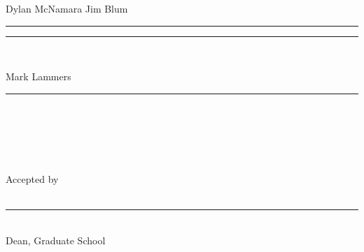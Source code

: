 \documentclass[12 pt]{uncw_thesis}
\begin{document}
\begin{singlespace}
\begin{center}
	Dylan McNamara \hspace{2.5in}  Jim Blum ~~~\\
	
	\vspace{-0.1in}
	\rule{2.5in}{.01in} \hspace{0.9in}   \rule{2.5in}{.01in}\\
		
\end{center}
 \begin{center}
 
 	Mark Lammers\\
	
	\vspace{-0.1in}
	\rule{2.5in}{.01in}\\
	\hskip 1pt \\
	\hskip 1pt \\
	\hskip 1pt \\
	\hskip 1pt \\    %
	Accepted by\\
	\hskip 1pt \\    %
	\rule{2.5in}{.01in}\\
	Dean, Graduate School
	
\end{center}
\end{singlespace}

\newpage
%
%
%
%
%
%
\newpage
\pagestyle{plain}
 \setcounter{page}{2}
\begin{center}
\tableofcontents
\end{center}
%
%
\newpage
{}
\end{document}
